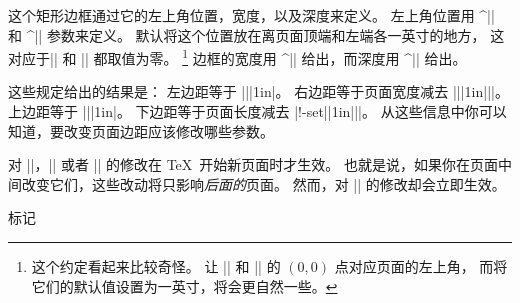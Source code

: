 {{{{{{{{{{%
这个矩形边框通过它的左上角位置，宽度，以及深度来定义。
左上角位置用 ^|\hoffset| 和 ^|\voffset| \ctsref\voffset 参数来定义。
默认将这个位置放在离页面顶端和左端各一英寸的地方，
这对应于|\hoffset| 和 |\voffset| 都取值为零。%
\footnote{这个约定看起来比较奇怪。
让 |\hoffset| 和 |\voffset| 的 $(0,0)$ 点对应页面的左上角，
而将它们的默认值设置为一英寸，将会更自然一些。}
边框的宽度用 ^|\hsize| 给出，而深度用 ^|\vsize| 给出。

这些规定给出的结果是：
\ulist\compact
\li 左边距等于 |\hoffset|\tplus|1in|。
\li 右边距等于页面宽度减去 |\hoffset|\tplus|1in|\tplus|\hsize|。
\li 上边距等于 |\voffset|\tplus|1in|。
\li 下边距等于页面长度减去 |\voff!-set|\tplus|1in|\tplus|\vsize|。
\endulist
从这些信息中你可以知道，要改变页面边距应该修改哪些参数。

对 |\hoffset|，|\voffset| 或者 |\vsize| 的修改在 \TeX\ 开始新页面时才生效。
也就是说，如果你在页面中间改变它们，这些改动将只影响\emph{后面的}页面。
然而，对 |\hsize| 的修改却会立即生效。
\endconcept


\concept 标记

}}}}}}}}}}
